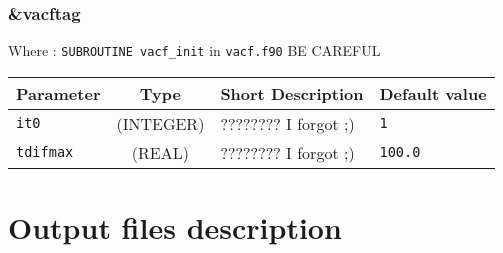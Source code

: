 \documentclass[a4paper]{article}
\begin{document}
\subsubsection{\&vacftag}

Where : \verb?SUBROUTINE vacf_init? in \verb?vacf.f90?
BE CAREFUL
\newline

\begin{longtable}{l|c|m{8cm}|m{2cm}}
\hline
\hline
Parameter        &  Type              &          Short Description                                                          & Default value \\
\hline
\hline
\rule[-0.75cm]{0cm}{1.5cm}
\verb?it0?       & (INTEGER)          & ???????? I forgot ;)                                                                & \verb?1? \\
\hline
\rule[-0.75cm]{0cm}{1.5cm}
\verb?tdifmax?   & (REAL)             & ???????? I forgot ;)                                                                & \verb?100.0? \\ 
\hline
\hline
\end{longtable}


\section{Output files description}



\end{document}

